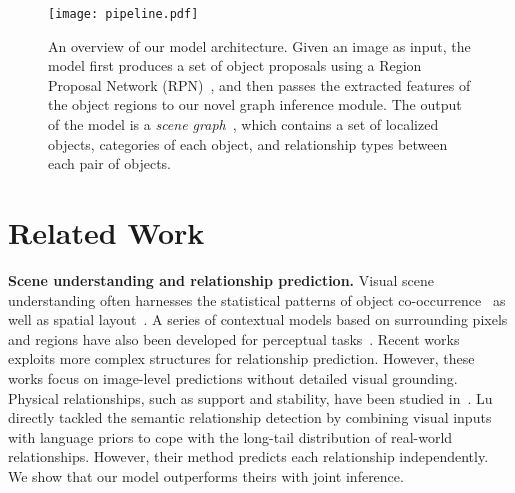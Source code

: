 \documentclass[10pt,twocolumn,letterpaper]{article}
\begin{document}
\begin{figure}[htp!]
    \begin{center}
        \texttt{[image: pipeline.pdf]}
\vspace{3pt}
        \caption{An overview of our model architecture. Given an image as input, the model first produces a set of object proposals using a Region Proposal Network (RPN)~\cite{renNIPS15fasterrcnn}, and then passes the extracted features of the object regions to our novel graph inference module. The output of the model is a \emph{scene graph}~\cite{Johnson2015-lm}, which contains a set of localized objects, categories of each object, and relationship types between each pair of objects.}
    \label{fig:pipeline}

    \end{center}
\vspace{-10pt}

\end{figure}


\section{Related Work}


\noindent \textbf{Scene understanding and relationship prediction.}
Visual scene understanding often harnesses the statistical patterns of object co-occurrence~\cite{galleguillos2008object,
ladicky2010graph, rabinovich2007objects, salakhutdinov2011learning} as well as spatial
layout~\cite{baur2008statistics, desai2011discriminative}. 
A series of contextual models based on surrounding pixels and regions have also been developed for perceptual tasks~\cite{bell2015inside,RCNN,lin2013holistic,mottaghi2014role}.
Recent works~\cite{HICO,ramanathan2015learning} exploits more complex structures for relationship prediction. However, these works focus on image-level predictions without detailed visual grounding.
Physical relationships, such as support and stability, have been studied in~\cite{Jia2013-la, nyudepth, Zheng2015-tm}. 
Lu \etal \cite{lu2016visual} directly tackled the semantic relationship detection by combining visual inputs with language priors to cope with the long-tail distribution of real-world relationships. However, their method predicts each relationship independently. We show that our model outperforms theirs with joint inference.
\vspace{5pt}
\end{document}
